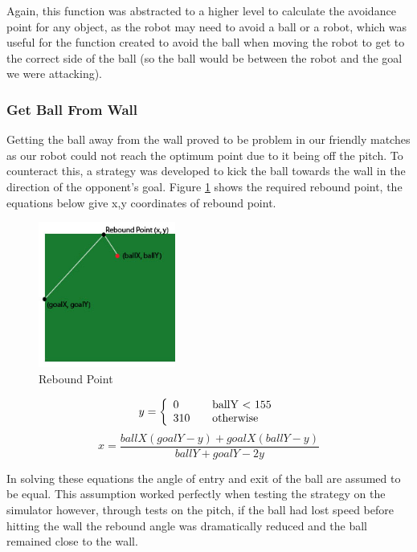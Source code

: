 Again, this function was abstracted to a higher level to calculate the avoidance point for any object, as the robot may need to avoid a ball or a robot, which was useful for the function created to avoid the ball when moving the robot to get to the correct side of the ball (so the ball would be between the robot and the goal we were attacking). \linebreak

\subsubsection{Get Ball From Wall}
Getting the ball away from the wall proved to be problem in our friendly matches as our robot could not reach the optimum point due to it being off the pitch. To counteract this, a strategy was developed to kick the ball towards the wall in the direction of the opponent's goal. Figure \ref{fig:rebound} shows the required rebound point, the equations below give x,y coordinates of rebound point.

\begin{figure}[htp]
\begin{center}
\leavevmode
\includegraphics[width=0.4\textwidth] {images/rebound.jpg}
\end{center}
\caption{Rebound Point}
\label{fig:rebound}
\end{figure}

\[y = \left\{ 
\begin{array}{l l}
  0 & \quad \mbox{ballY $<$ 155}\\
  310 & \quad \mbox{otherwise}\\ \end{array} \right. \]
\[x = \frac{ballX(goalY-y) + goalX(ballY-y)}{ballY + goalY - 2y} \]

In solving these equations the angle of entry and exit of the ball are assumed to be equal. This assumption worked perfectly when testing the strategy on the simulator however, through tests on the pitch, if the ball had lost speed before hitting the wall the rebound angle was dramatically reduced and the ball remained close to the wall. 

